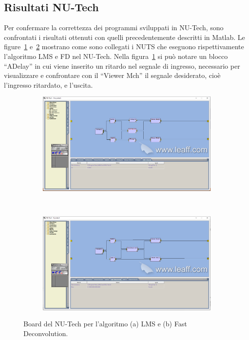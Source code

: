 \documentclass[12pt,a4paper,titlepage]{article}
\begin{document}
\subsection{Risultati NU-Tech}
\label{subsec:risultati_nutech}
Per confermare la correttezza dei programmi sviluppati in NU-Tech, sono confrontati i risultati ottenuti con quelli precedentemente descritti in Matlab. Le figure~\ref{fig:lms_template_nutech} e~\ref{fig:fd_template_nutech} mostrano come sono collegati i NUTS che eseguono rispettivamente l'algoritmo LMS e FD nel NU-Tech. Nella figura~\ref{fig:lms_template_nutech} si può notare un blocco ``ADelay'' in cui viene inserito un ritardo nel segnale di ingresso, necessario per visualizzare e confrontare con il ``Viewer Mch'' il segnale desiderato, cioè l'ingresso ritardato, e l'uscita.

\begin{figure}[h]
	\centering
	\begin{subfigure}{1\textwidth}
		\includegraphics[width=1\textwidth]{Immagini/lms_template_nutech}
		\caption{}
		\label{fig:lms_template_nutech}
	\end{subfigure}\\
	\begin{subfigure}{1\textwidth}
			\includegraphics[width=1\textwidth]{Immagini/fd_template_nutech}
			\caption{}
			\label{fig:fd_template_nutech}
	\end{subfigure}
	\caption{Board del NU-Tech per l'algoritmo (a) LMS e (b) Fast Deconvolution.}
	\label{fig:template_nutech}
\end{figure}
\end{document}
